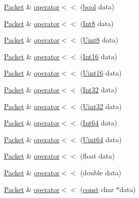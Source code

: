 \begin{DoxyCompactItemize}
\hyperlink{classsf_1_1_packet}{Packet} \& \hyperlink{classsf_1_1_packet_aa5a465ed02ba29d83ecdafb0ac3fff21}{operator$<$$<$} (\hyperlink{term__entry_8h_a002004ba5d663f149f6c38064926abac}{bool} data)
\item 
\hyperlink{classsf_1_1_packet}{Packet} \& \hyperlink{classsf_1_1_packet_a034b68a4281cae0b53a43af7aa4172f6}{operator$<$$<$} (\hyperlink{namespacesf_a69b109973eac74e22b97e5339bdb68dd}{Int8} data)
\item 
\hyperlink{classsf_1_1_packet}{Packet} \& \hyperlink{classsf_1_1_packet_af27e4498bf83151b0591d5f04a8b30e1}{operator$<$$<$} (\hyperlink{namespacesf_a4ef3d630785c4f296f9b4f274c33d78e}{Uint8} data)
\item 
\hyperlink{classsf_1_1_packet}{Packet} \& \hyperlink{classsf_1_1_packet_afda8754ab4f2a34600f0153ba9ff24fa}{operator$<$$<$} (\hyperlink{namespacesf_a3c8e10435e2a310a7741755e66b5c94e}{Int16} data)
\item 
\hyperlink{classsf_1_1_packet}{Packet} \& \hyperlink{classsf_1_1_packet_a557cbc0289135209248aca1aa2117c40}{operator$<$$<$} (\hyperlink{namespacesf_a2fcaf787248b0b83dfb6b145ca348246}{Uint16} data)
\item 
\hyperlink{classsf_1_1_packet}{Packet} \& \hyperlink{classsf_1_1_packet_ad60c9ad6e4e92399e2a36938ad122d05}{operator$<$$<$} (\hyperlink{namespacesf_ac2dfd4952377a26dee4750e2e4a30a15}{Int32} data)
\item 
\hyperlink{classsf_1_1_packet}{Packet} \& \hyperlink{classsf_1_1_packet_afb113b73749efb662a75deb98257ad34}{operator$<$$<$} (\hyperlink{namespacesf_aa746fb1ddef4410bddf198ebb27e727c}{Uint32} data)
\item 
\hyperlink{classsf_1_1_packet}{Packet} \& \hyperlink{classsf_1_1_packet_abba83b3c98af99190886d20d7595a94c}{operator$<$$<$} (\hyperlink{namespacesf_a2840579fed3494d9f330baf7a5a19903}{Int64} data)
\item 
\hyperlink{classsf_1_1_packet}{Packet} \& \hyperlink{classsf_1_1_packet_a60df5a35a3fb6416131d77232737c68b}{operator$<$$<$} (\hyperlink{namespacesf_add9ac83466d96b9f50a009b9f4064266}{Uint64} data)
\item 
\hyperlink{classsf_1_1_packet}{Packet} \& \hyperlink{classsf_1_1_packet_a76d31c4f864253a7e9b53701b4660fe5}{operator$<$$<$} (float data)
\item 
\hyperlink{classsf_1_1_packet}{Packet} \& \hyperlink{classsf_1_1_packet_a3b3077720a486b569ac8e7dec638a3f0}{operator$<$$<$} (double data)
\item 
\hyperlink{classsf_1_1_packet}{Packet} \& \hyperlink{classsf_1_1_packet_a67c9985f7b3d6e90886e56e309280a9d}{operator$<$$<$} (\hyperlink{term__entry_8h_a57bd63ce7f9a353488880e3de6692d5a}{const} char $\ast$data)

\end{DoxyCompactItemize}
